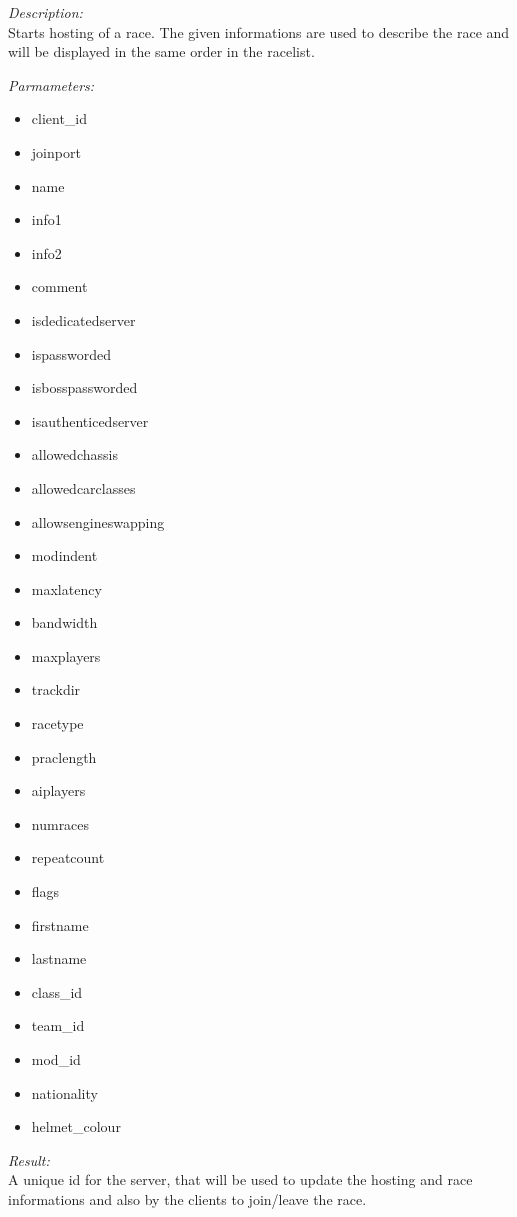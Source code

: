 \begin{description}
\item {\it Description:}\\
Starts hosting of a race. The given informations are used to describe the race and will be displayed in the same order in the racelist.
\item {\it Parmameters:}
\begin{itemize}
\item client\_id
\item joinport
\item name
\item info1
\item info2
\item comment
\item isdedicatedserver
\item ispassworded
\item isbosspassworded
\item isauthenticedserver
\item allowedchassis
\item allowedcarclasses
\item allowsengineswapping
\item modindent
\item maxlatency
\item bandwidth
\item maxplayers
\item trackdir
\item racetype
\item praclength
\item aiplayers
\item numraces
\item repeatcount
\item flags
\item firstname
\item lastname
\item class\_id
\item team\_id
\item mod\_id
\item nationality
\item helmet\_colour
\end{itemize}
\item {\it Result:}\\
A unique id for the server, that will be used to update the hosting and race informations and also by the clients to join/leave the race.
\end{description}

